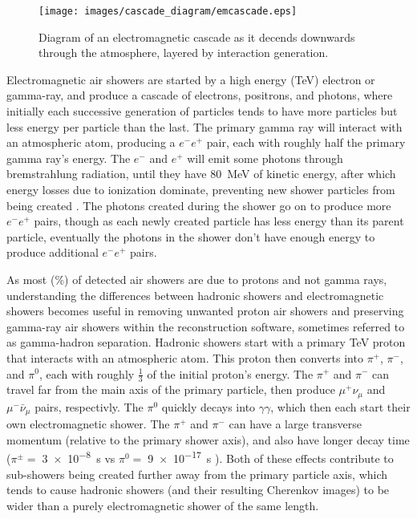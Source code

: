   \begin{figure}[ht]
    \centering
    \texttt{[image: images/cascade\_diagram/emcascade.eps]}
    \caption[Electromagnetic Cascade]{
      Diagram of an electromagnetic cascade as it decends downwards through the atmosphere, layered by interaction generation.
    }
    \label{fig:emcascade}
  \end{figure}

  Electromagnetic air showers are started by a high energy (\nicetilde TeV) electron or gamma-ray, and produce a cascade of electrons, positrons, and photons, where initially each successive generation of particles tends to have more particles but less energy per particle than the last.
  The primary gamma ray will interact with an atmospheric atom, producing a $e^{-}e^{+}$ pair, each with roughly half the primary gamma ray's energy.
  The $e^{-}$ and $e^{+}$ will emit some photons through bremstrahlung radiation, until they have \nicetilde \SI{80}{MeV} of kinetic energy, after which energy losses due to ionization dominate, preventing new shower particles from being created \cite{pdg_2014}.
  The photons created during the shower go on to produce more $e^{-}e^{+}$ pairs, though as each newly created particle has less energy than its parent particle, eventually the photons in the shower don't have enough energy to produce additional $e^{-}e^{+}$ pairs.

  As most (\%) of detected air showers are due to protons and not gamma rays, understanding the differences between hadronic showers and electromagnetic showers becomes useful in removing unwanted proton air showers and preserving gamma-ray air showers within the reconstruction software, sometimes referred to as gamma-hadron separation.
  Hadronic showers start with a primary \nicetilde TeV proton that interacts with an atmospheric atom.
  This proton then converts into $\pi^{+}$, $\pi^{-}$, and $\pi^{0}$, each with roughly \nicetilde $\frac{1}{3}$ of the initial proton's energy.
  The $\pi^{+}$ and $\pi^{-}$ can travel far from the main axis of the primary particle, then produce $\mu^{+}\nu_{\mu}$ and $\mu^{-}\bar{\nu}_{\mu}$ pairs, respectivly.
  The $\pi^{0}$ quickly decays into $\gamma\gamma$, which then each start their own electromagnetic shower.
  The $\pi^{+}$ and $\pi^{-}$ can have a large transverse momentum (relative to the primary shower axis), and also have longer decay time ($\pi^{\pm}=\;$\SI{3e-8}{s} vs $\pi^{0}=\;$\SI{9e-17}{s} \cite{pdg_2014} ).
  Both of these effects contribute to sub-showers being created further away from the primary particle axis, which tends to cause hadronic showers (and their resulting Cherenkov images) to be wider than a purely electromagnetic shower of the same length. 

